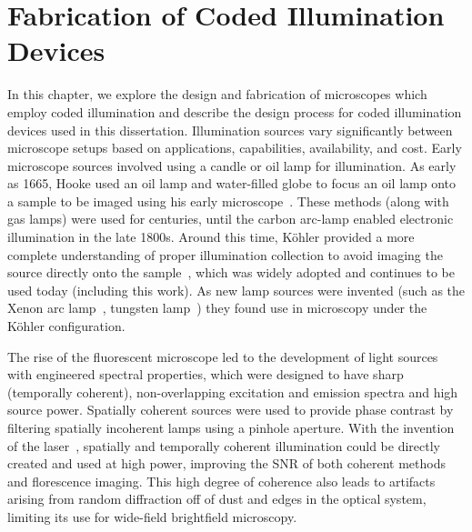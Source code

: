 \chapter{Fabrication of Coded Illumination Devices}\label{ch:fabrication}

In this chapter, we explore the design and fabrication of microscopes which employ coded illumination and describe the design process for coded illumination devices used in this dissertation. Illumination sources vary significantly between microscope setups based on applications, capabilities, availability, and cost. Early microscope sources involved using a candle or oil lamp for illumination. As early as 1665, Hooke used an oil lamp and water-filled globe to focus an oil lamp onto a sample to be imaged using his early microscope~\cite{hookeMicrographica}. These methods (along with gas lamps) were used for centuries, until the carbon arc-lamp enabled electronic illumination in the late 1800s. Around this time, K\"ohler provided a more complete understanding of proper illumination collection to avoid imaging the source directly onto the sample~\cite{kohler1893neues}, which was widely adopted and continues to be used today (including this work). As new lamp sources were invented (such as the Xenon arc lamp~\cite{anderson1951xenon}, tungsten lamp~\cite{edison1880electric}) they found use in microscopy under the K\"ohler configuration.

The rise of the fluorescent microscope led to the development of light sources with engineered spectral properties, which were designed to have sharp (temporally coherent), non-overlapping excitation and emission spectra and high source power. Spatially coherent sources were used to provide phase contrast \cite{smithDIC, zernike1942phase} by filtering spatially incoherent lamps using a pinhole aperture. With the invention of the laser~\cite{schawlow1958infrared}, spatially and temporally coherent illumination could be directly created and used at high power, improving the SNR of both coherent methods and florescence imaging. This high degree of coherence also leads to artifacts arising from random diffraction off of dust and edges in the optical system, limiting its use for wide-field brightfield microscopy.

